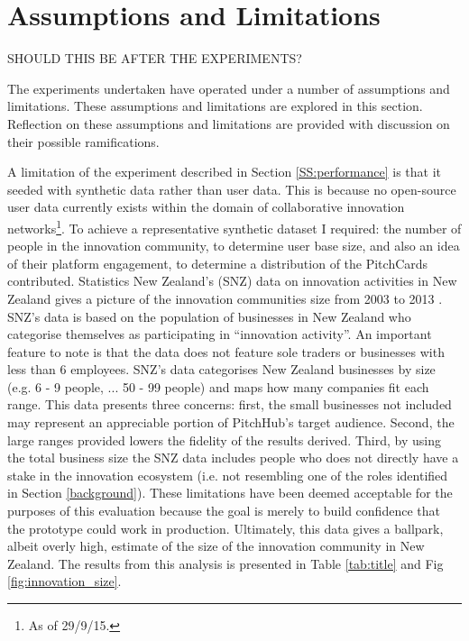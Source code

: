 \section{Assumptions and Limitations}
SHOULD THIS BE AFTER THE EXPERIMENTS?

The experiments undertaken have operated under a number of assumptions and limitations. These assumptions and limitations are explored in this section. Reflection on these assumptions and limitations are provided with discussion on their possible ramifications.

A limitation of the experiment described in Section \ref{SS:performance} is that it seeded with synthetic data rather than user data. This is because no open-source user data currently exists within the domain of collaborative innovation networks\footnote{As of 29/9/15.}. To achieve a representative synthetic dataset I required: the number of people in the innovation community, to determine user base size, and also an idea of their platform engagement, to determine a distribution of the PitchCards contributed. Statistics New Zealand's (SNZ) data on innovation activities in New Zealand gives a picture of the innovation communities size from 2003 to 2013 \cite{Innov5:online}. 
SNZ's data is based on the population of businesses in New Zealand who categorise themselves as participating in ``innovation activity''. An important feature to note is that the data does not feature sole traders or businesses with less than 6 employees. SNZ's data categorises New Zealand businesses by size (e.g. 6 - 9 people, ... 50 - 99 people) and maps how many companies fit each range. 
This data presents three concerns: first, the small businesses not included may represent an appreciable portion of PitchHub's target audience. Second, the large ranges provided lowers the fidelity of the results derived. Third, by using the total business size the SNZ data includes people who does not directly have a stake in the innovation ecosystem (i.e. not resembling one of the roles identified in Section \ref{background}). These limitations have been deemed acceptable for the purposes of this evaluation because the goal is merely to build confidence that the prototype could work in production. Ultimately, this data gives a ballpark, albeit overly high, estimate of the size of the innovation community in New Zealand. The results from this analysis is presented in Table \ref{tab:title} and Fig \ref{fig:innovation_size}.

